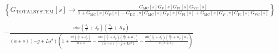 \documentclass{article}
\begin{document}
\begin{doublespace}
\noindent\(\left\{G_{\text{TOTALSYSTEM}}[s]\to \frac{G_{\text{MC}}[s] G_P[s] G_{\text{PI}}[s] G_{\text{VC}}[s]}{1+G_{\text{MC}}[s] G_P[s]-G_{\text{DC}}[s]
G_{\text{MC}}[s] G_P[s] G_{\text{PI}}[s]+G_{\text{MC}}[s] G_P[s] G_{\text{PI}}[s] G_{\text{VC}}[s]}\right\}\)
\end{doublespace}

\begin{doublespace}
\noindent\(-\frac{a b s \left(\frac{J_i}{s}+J_p\right) \left(\frac{K_i}{s}+K_p\right)}{(a+s) \left(-g+L s^2\right) \left(1+\frac{a b \left(\frac{J_i}{s}+J_p\right)}{a+s}-\frac{a
b s \left(\frac{J_i}{s}+J_p\right) \left(\frac{K_i}{s}+K_p\right)}{(a+s) \left(-g+L s^2\right)}-\frac{a b \left(\frac{J_i}{s}+J_p\right) \left(\frac{K_i}{s}+K_p\right)
K_t}{s (a+s)}\right)}\)
\end{doublespace}
\end{document}
